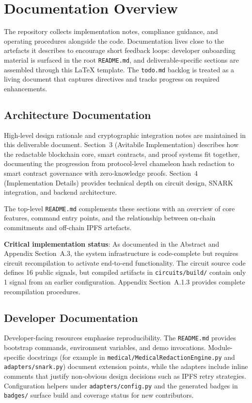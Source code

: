 \section{Documentation Overview}

The repository collects implementation notes, compliance guidance, and operating procedures alongside the code. Documentation lives close to the artefacts it describes to encourage short feedback loops: developer onboarding material is surfaced in the root \texttt{README.md}, and deliverable-specific sections are assembled through this \LaTeX{} template. The \texttt{todo.md} backlog is treated as a living document that captures directives and tracks progress on required enhancements.

\subsection{Architecture Documentation}

High-level design rationale and cryptographic integration notes are maintained in this deliverable document. Section~3 (Avitabile Implementation) describes how the redactable blockchain core, smart contracts, and proof systems fit together, documenting the progression from protocol-level chameleon hash redaction to smart contract governance with zero-knowledge proofs. Section~4 (Implementation Details) provides technical depth on circuit design, SNARK integration, and backend architecture.

The top-level \texttt{README.md} complements these sections with an overview of core features, command entry points, and the relationship between on-chain commitments and off-chain IPFS artefacts. 

\textbf{Critical implementation status}: As documented in the Abstract and Appendix Section~A.3, the system infrastructure is code-complete but requires circuit recompilation to activate end-to-end functionality. The circuit source code defines 16 public signals, but compiled artifacts in \texttt{circuits/build/} contain only 1 signal from an earlier configuration. Appendix Section~A.1.3 provides complete recompilation procedures.

\subsection{Developer Documentation}

Developer-facing resources emphasise reproducibility. The \texttt{README.md} provides bootstrap commands, environment variables, and demo invocations. Module-specific docstrings (for example in \texttt{medical/MedicalRedactionEngine.py} and \texttt{adapters/snark.py}) document extension points, while the adapters include inline comments that justify non-obvious design decisions such as IPFS retry strategies. Configuration helpers under \texttt{adapters/config.py} and the generated badges in \texttt{badges/} surface build and coverage status for new contributors.

